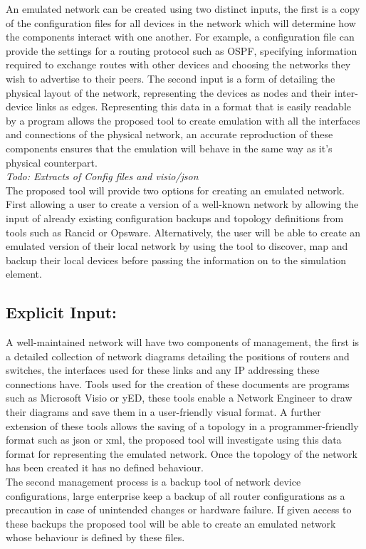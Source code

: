 \documentclass[11pt]{report}
\begin{document}
An emulated network can be created using two distinct inputs, the first is a copy of the configuration files for all devices in the network which will determine how the components interact with one another. For example, a configuration file can provide the settings for a routing protocol such as OSPF, specifying information required to exchange routes with other devices and choosing the networks they wish to advertise to their peers. The second input is a form of detailing the physical layout of the network, representing the devices as nodes and their inter-device links as edges. Representing this data in a format that is easily readable by a program allows the proposed tool to create emulation with all the interfaces and connections of the physical network, an accurate reproduction of these components ensures that the emulation will behave in the same way as it's physical counterpart.
\\
\textit{Todo: Extracts of Config files and visio/json}
\\
The proposed tool will provide two options for creating an emulated network. First allowing a user to create a version of a well-known network by allowing the input of already existing configuration backups and topology definitions from tools such as Rancid or Opsware. Alternatively, the user will be able to create an emulated version of their local network by using the tool to discover, map and backup their local devices before passing the information on to the simulation element.

\subsection{Explicit Input:}

A well-maintained network will have two components of management, the first is a detailed collection of network diagrams detailing the positions of routers and switches, the interfaces used for these links and any IP addressing these connections have. Tools used for the creation of these documents are programs such as Microsoft Visio or yED, these tools enable a Network Engineer to draw their diagrams and save them in a user-friendly visual format. A further extension of these tools allows the saving of a topology in a programmer-friendly format such as json or xml, the proposed tool will investigate using this data format for representing the emulated network. Once the topology of the network has been created it has no defined behaviour.
\\
The second management process is a backup tool of network device configurations, large enterprise keep a backup of all router configurations as a precaution in case of unintended changes or hardware failure. If given access to these backups the proposed tool will be able to create an emulated network whose behaviour is defined by these files.
\end{document}
